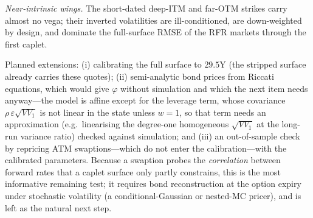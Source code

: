 \documentclass[11pt]{article}
\begin{document}
\emph{Near-intrinsic wings.} The short-dated deep-ITM and far-OTM strikes carry almost no vega; their
inverted volatilities are ill-conditioned, are down-weighted by design, and dominate the
full-surface RMSE of the RFR markets through the first caplet.

Planned extensions: (i) calibrating the full surface to \(29.5\)Y (the stripped surface already carries these
quotes); (ii) semi-analytic bond prices from Riccati equations, which would give \(\varphi\) without
simulation and which the next item needs anyway---the model is affine except for the leverage
term, whose covariance \(\rho\,\varepsilon\sqrt{V V_1}\) is not linear in the state unless \(w=1\),
so that term needs an approximation (e.g.\ linearising the degree-one homogeneous
\(\sqrt{V V_1}\) at the long-run variance ratio) checked against simulation; and (iii) an
out-of-sample check by repricing ATM
swaptions---which do not enter the calibration---with the calibrated parameters. Because a swaption probes the
\emph{correlation} between forward rates that a caplet surface only partly constrains, this is the
most informative remaining test; it requires bond reconstruction at the option expiry under
stochastic volatility (a conditional-Gaussian or nested-MC pricer), and is left as the natural next
step.

\clearpage
\appendix
\end{document}
